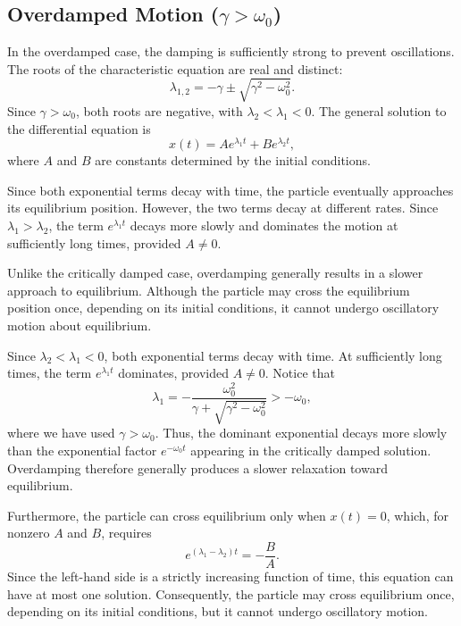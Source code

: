 \documentclass[12pt]{article}
\begin{document}
\subsection{Overdamped Motion ($\gamma>\omega_0$)}

In the overdamped case, the damping is sufficiently strong to prevent oscillations. The roots of the characteristic equation are real and distinct:
\begin{equation}
    \lambda_{1,2}=-\gamma\pm\sqrt{\gamma^2-\omega_0^2}.
\end{equation}
Since $\gamma>\omega_0$, both roots are negative,
with $\lambda_2<\lambda_1<0$.
The general solution to the differential equation is
\begin{equation}
    x(t)=Ae^{\lambda_1 t}+Be^{\lambda_2 t},
    \label{eq:overdamped-solution}
\end{equation}
where $A$ and $B$ are constants determined by the initial conditions.

Since both exponential terms decay with time, the particle eventually approaches its equilibrium position. However, the two terms decay at different rates. Since $\lambda_1>\lambda_2$, the term $e^{\lambda_1 t}$ decays more slowly and dominates the motion at sufficiently long times, provided $A\neq 0$.

Unlike the critically damped case, overdamping generally results in a slower approach to equilibrium. Although the particle may cross the equilibrium position once, depending on its initial conditions, it cannot undergo oscillatory
motion about equilibrium.


Since $\lambda_2<\lambda_1<0$, both exponential terms
decay with time. At sufficiently long times, the term
$e^{\lambda_1 t}$ dominates, provided $A\neq 0$.
Notice that
\begin{equation}
    \lambda_1
    =-\frac{\omega_0^2}
    {\gamma+\sqrt{\gamma^2-\omega_0^2}}
    >-\omega_0,
\end{equation}
where we have used $\gamma>\omega_0$.
Thus, the dominant exponential decays more slowly than
the exponential factor $e^{-\omega_0 t}$ appearing in
the critically damped solution. Overdamping therefore
generally produces a slower relaxation toward equilibrium.

Furthermore, the particle can cross equilibrium only when $x(t)=0$, which, for nonzero $A$ and $B$, requires
\begin{equation}
    e^{(\lambda_1-\lambda_2)t}=-\frac{B}{A}.
\end{equation}
Since the left-hand side is a strictly increasing
function of time, this equation can have at most one solution. Consequently, the particle may cross equilibrium once, depending on its initial conditions, but it cannot undergo oscillatory motion.
\end{document}
